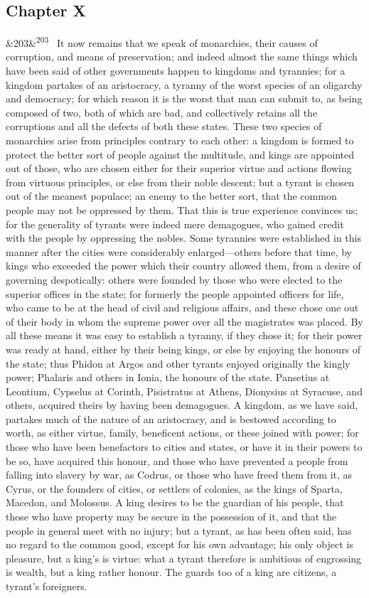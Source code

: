 \documentclass[12pt]{article}
\newcommand{\para}[1][]{\par\noindent\ifx&#1&\else\textsuperscript{\footnotesize #1}~\fi}
\begin{document}
\subsection*{Chapter X}

\para[203] It now remains that we speak of monarchies, their causes of corruption, and means of preservation; and indeed almost the same things which have been said of other governments happen to kingdoms and tyrannies; for a kingdom partakes of an aristocracy, a tyranny of the worst species of an oligarchy and democracy; for which reason it is the worst that man can submit to, as being composed of two, both of which are bad, and collectively retains all the corruptions and all the defects of both these states. These two species of monarchies arise from principles contrary to each other: a kingdom is formed to protect the better sort of people against the multitude, and kings are appointed out of those, who are chosen either for their superior virtue and actions flowing from virtuous principles, or else from their noble descent; but a tyrant is chosen out of the meanest populace; an enemy to the better sort, that the common people may not be oppressed by them. That this is true experience convinces us; for the generality of tyrants were indeed mere demagogues, who gained credit with the people by oppressing the nobles. Some tyrannies were established in this manner after the cities were considerably enlarged---others before that time, by kings who exceeded the power which their country allowed them, from a desire of governing despotically: others were founded by those who were elected to the superior offices in the state; for formerly the people appointed officers for life, who came to be at the head of civil and religious affairs, and these chose one out of their body in whom the supreme power over all the magistrates was placed. By all these means it was easy to establish a tyranny, if they chose it; for their power was ready at hand, either by their being kings, or else by enjoying the honours of the state; thus Phidon at Argos and other tyrants enjoyed originally the kingly power; Phalaris and others in Ionia, the honours of the state. Pansetius at Leontium, Cypselus at Corinth, Pisistratus at Athens, Dionysius at Syracuse, and others, acquired theirs by having been demagogues. A kingdom, as we have said, partakes much of the nature of an aristocracy, and is bestowed according to worth, as either virtue, family, beneficent actions, or these joined with power; for those who have been benefactors to cities and states, or have it in their powers to be so, have acquired this honour, and those who have prevented a people from falling into slavery by war, as Codrus, or those who have freed them from it, as Cyrus, or the founders of cities, or settlers of colonies, as the kings of Sparta, Macedon, and Molossus. A king desires to be the guardian of his people, that those who have property may be secure in the possession of it, and that the people in general meet with no injury; but a tyrant, as has been often said, has no regard to the common good, except for his own advantage; his only object is pleasure, but a king's is virtue: what a tyrant therefore is ambitious of engrossing is wealth, but a king rather honour. The guards too of a king are citizens, a tyrant's foreigners.
\end{document}
